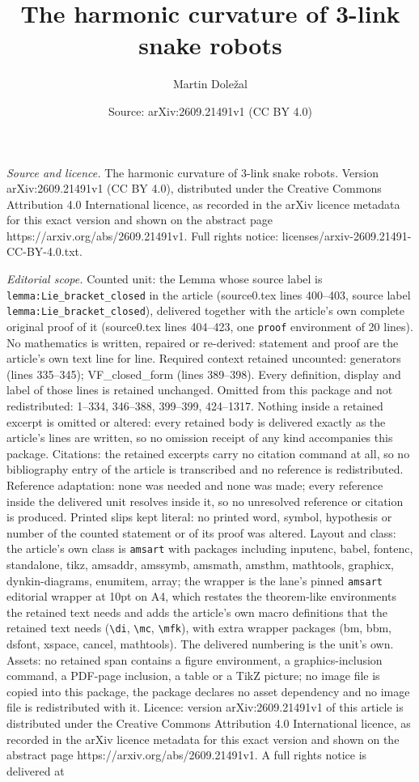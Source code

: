 \documentclass[10pt,a4paper]{amsart}
\title[The harmonic curvature of 3-link snake robots]{The harmonic curvature of 3-link snake robots}
\author{Martin Dole\v{z}al}
\date{Source: arXiv:2609.21491v1 (CC BY 4.0)}
\begin{document}
\maketitle

\noindent\emph{Source and licence.} The harmonic curvature of 3-link snake robots. Version arXiv:2609.21491v1 (CC BY 4.0), distributed under the Creative Commons Attribution 4.0 International licence, as recorded in the arXiv licence metadata for this exact version and shown on the abstract page https://arxiv.org/abs/2609.21491v1. Full rights notice: licenses/arxiv-2609.21491-CC-BY-4.0.txt.\par\smallskip

\noindent\textit{Editorial scope.} Counted unit: the Lemma whose source label is \texttt{lemma:Lie\_bracket\_closed} in the article (source0.tex lines 400--403, source label \texttt{lemma:Lie\_bracket\_closed}), delivered together with the article's own complete original proof of it (source0.tex lines 404--423, one \texttt{proof} environment of 20 lines). No mathematics is written, repaired or re-derived: statement and proof are the article's own text line for line. Required context retained uncounted: generators (lines 335--345); VF\_closed\_form (lines 389--398). Every definition, display and label of those lines is retained unchanged. Omitted from this package and not redistributed: 1--334, 346--388, 399--399, 424--1317. Nothing inside a retained excerpt is omitted or altered: every retained body is delivered exactly as the article's lines are written, so no omission receipt of any kind accompanies this package. Citations: the retained excerpts carry no citation command at all, so no bibliography entry of the article is transcribed and no reference is redistributed. Reference adaptation: none was needed and none was made; every reference inside the delivered unit resolves inside it, so no unresolved reference or citation is produced. Printed slips kept literal: no printed word, symbol, hypothesis or number of the counted statement or of its proof was altered. Layout and class: the article's own class is \texttt{amsart} with packages including inputenc, babel, fontenc, standalone, tikz, amsaddr, amssymb, amsmath, amsthm, mathtools, graphicx, dynkin-diagrams, enumitem, array; the wrapper is the lane's pinned \texttt{amsart} editorial wrapper at 10pt on A4, which restates the theorem-like environments the retained text needs and adds the article's own macro definitions that the retained text needs (\texttt{\textbackslash di}, \texttt{\textbackslash mc}, \texttt{\textbackslash mfk}), with extra wrapper packages (bm, bbm, dsfont, xspace, cancel, mathtools). The delivered numbering is the unit's own. Assets: no retained span contains a figure environment, a graphics-inclusion command, a PDF-page inclusion, a table or a TikZ picture; no image file is copied into this package, the package declares no asset dependency and no image file is redistributed with it. Licence: version arXiv:2609.21491v1 of this article is distributed under the Creative Commons Attribution 4.0 International licence, as recorded in the arXiv licence metadata for this exact version and shown on the abstract page https://arxiv.org/abs/2609.21491v1. A full rights notice is delivered at 
\end{document}
